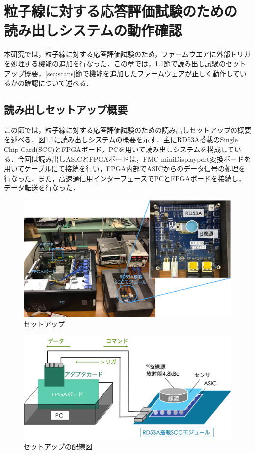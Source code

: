 \chapter{粒子線に対する応答評価試験のための\\読み出しシステムの動作確認}
本研究では，粒子線に対する応答評価試験のため，ファームウエアに外部トリガを処理する機能の追加を行なった．この章では，\ref{sec:setup}節で読み出し試験のセットアップ概要，\ref{sec:scans}節で機能を追加したファームウェアが正しく動作しているかの確認について述べる．

\section{読み出しセットアップ概要}
\label{sec:setup}
この節では，粒子線に対する応答評価試験のための読み出しセットアップの概要を述べる．図\ref{fig:setup}に読み出しシステムの概要を示す．主にRD53A搭載のSingle Chip Card(SCC)とFPGAボード，PCを用いて読み出しシステムを構成している．今回は読み出しASICとFPGAボードは，FMC-miniDisplayport変換ボードを用いてケーブルにて接続を行い，FPGA内部でASICからのデータ信号の処理を行なった．また，高速通信用インターフェースでPCとFPGAボードを接続し，データ転送を行なった．\par

\begin{figure}[h]
  \centering
  \includegraphics[width=15cm]{./figure/Setup.png}
  \caption{セットアップ}
  \label{fig:setup}
\end{figure}

\begin{figure}[h]
  \centering
  \includegraphics[width=12cm]{./figure/selfsetupcab.png}
  \caption{セットアップの配線図}
  \label{fig:setupcab}
\end{figure}


